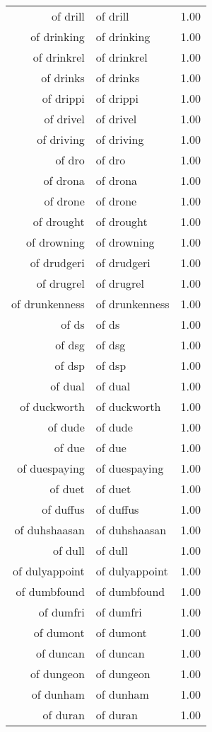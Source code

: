 \begin{table}[ht]
\begin{tabular}{rlr}
  of drill & of drill & 1.00 \\ 
  of drinking & of drinking & 1.00 \\ 
  of drinkrel & of drinkrel & 1.00 \\ 
  of drinks & of drinks & 1.00 \\ 
  of drippi & of drippi & 1.00 \\ 
  of drivel & of drivel & 1.00 \\ 
  of driving & of driving & 1.00 \\ 
  of dro & of dro & 1.00 \\ 
  of drona & of drona & 1.00 \\ 
  of drone & of drone & 1.00 \\ 
  of drought & of drought & 1.00 \\ 
  of drowning & of drowning & 1.00 \\ 
  of drudgeri & of drudgeri & 1.00 \\ 
  of drugrel & of drugrel & 1.00 \\ 
  of drunkenness & of drunkenness & 1.00 \\ 
  of ds & of ds & 1.00 \\ 
  of dsg & of dsg & 1.00 \\ 
  of dsp & of dsp & 1.00 \\ 
  of dual & of dual & 1.00 \\ 
  of duckworth & of duckworth & 1.00 \\ 
  of dude & of dude & 1.00 \\ 
  of due & of due & 1.00 \\ 
  of duespaying & of duespaying & 1.00 \\ 
  of duet & of duet & 1.00 \\ 
  of duffus & of duffus & 1.00 \\ 
  of duhshaasan & of duhshaasan & 1.00 \\ 
  of dull & of dull & 1.00 \\ 
  of dulyappoint & of dulyappoint & 1.00 \\ 
  of dumbfound & of dumbfound & 1.00 \\ 
  of dumfri & of dumfri & 1.00 \\ 
  of dumont & of dumont & 1.00 \\ 
  of duncan & of duncan & 1.00 \\ 
  of dungeon & of dungeon & 1.00 \\ 
  of dunham & of dunham & 1.00 \\ 
  of duran & of duran & 1.00 \\ 

\end{tabular}
\end{table}
